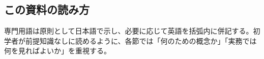 \subsection*{この資料の読み方}
専門用語は原則として日本語で示し、必要に応じて英語を括弧内に併記する。初学者が前提知識なしに読めるように、各節では「何のための概念か」「実務では何を見ればよいか」を重視する。
